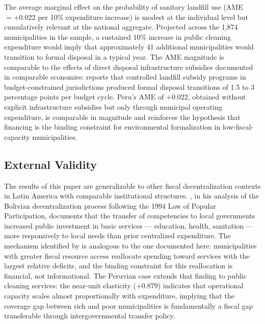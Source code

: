The average marginal effect on the probability of sanitary landfill use (AME $= +0.022$ per 10\% expenditure increase) is modest at the individual level but cumulatively relevant at the national aggregate. Projected across the 1,874 municipalities in the sample, a sustained 10\% increase in public cleaning expenditure would imply that approximately 41 additional municipalities would transition to formal disposal in a typical year. The AME magnitude is comparable to the effects of direct disposal infrastructure subsidies documented in comparable economies: \citet{Kinnaman2006} reports that controlled landfill subsidy programs in budget-constrained jurisdictions produced formal disposal transitions of 1.5 to 3 percentage points per budget cycle. Peru's AME of $+0.022$, obtained without explicit infrastructure subsidies but only through municipal operating expenditure, is comparable in magnitude and reinforces the hypothesis that financing is the binding constraint for environmental formalization in low-fiscal-capacity municipalities.

\subsection{External Validity}
\label{sec:validez_externa}

The results of this paper are generalizable to other fiscal decentralization contexts in Latin America with comparable institutional structures.
\citet{Faguet2004}, in his analysis of the Bolivian decentralization process following the 1994 Law of Popular Participation, documents that the transfer of competencies to local governments increased public investment in basic services --- education, health, sanitation --- more responsively to local needs than prior centralized expenditure.
The mechanism identified by \citet{Faguet2004} is analogous to the one documented here: municipalities with greater fiscal resource access reallocate spending toward services with the largest relative deficits, and the binding constraint for this reallocation is financial, not informational.
The Peruvian case extends that finding to public cleaning services: the near-unit elasticity ($+0.879$) indicates that operational capacity scales almost proportionally with expenditure, implying that the coverage gap between rich and poor municipalities is fundamentally a fiscal gap transferable through intergovernmental transfer policy.

